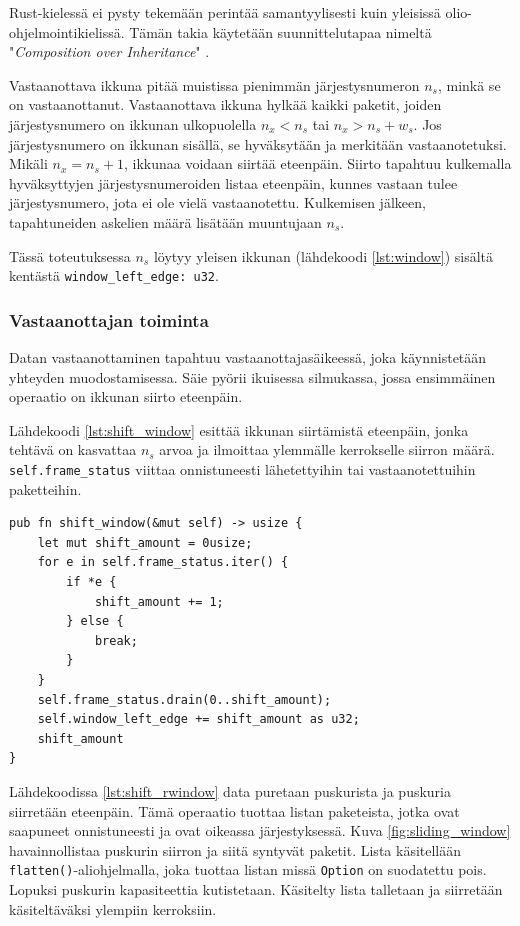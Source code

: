 \documentclass[a4paper,12pt]{article}
\begin{document}
    Rust-kielessä ei pysty tekemään perintää samantyylisesti kuin yleisissä olio-ohjelmointikielissä. Tämän takia
    käytetään suunnittelutapaa nimeltä "\textit{Composition over Inheritance}" \cite{Ivicevic202228Rust}.

    Vastaanottava ikkuna pitää muistissa pienimmän järjestysnumeron $n_s$, minkä se on vastaanottanut.
    Vastaanottava ikkuna hylkää kaikki paketit, joiden järjestysnumero on ikkunan ulkopuolella $n_x < n_s$ tai $n_x > n_s + w_s$. Jos järjestysnumero on ikkunan sisällä, se hyväksytään ja merkitään vastaanotetuksi. Mikäli $n_x = n_s + 1$, ikkunaa voidaan siirtää eteenpäin.
    Siirto tapahtuu kulkemalla hyväksyttyjen järjestysnumeroiden listaa eteenpäin, kunnes vastaan tulee järjestysnumero, jota ei ole vielä vastaanotettu. Kulkemisen jälkeen, tapahtuneiden askelien määrä lisätään muuntujaan $n_s$.

    Tässä toteutuksessa $n_s$ löytyy yleisen ikkunan (lähdekoodi \ref{lst:window}) sisältä kentästä \lstinline{window_left_edge: u32}.


    \subsubsection*{Vastaanottajan toiminta}
    Datan vastaanottaminen tapahtuu vastaanottajasäikeessä, joka käynnistetään yhteyden muodostamisessa.
    Säie pyörii ikuisessa silmukassa, jossa ensimmäinen operaatio on ikkunan siirto eteenpäin.

    Lähdekoodi \ref{lst:shift_window} esittää ikkunan siirtämistä eteenpäin, jonka tehtävä on kasvattaa $n_s$ arvoa ja ilmoittaa ylemmälle kerrokselle siirron määrä.
    \lstinline{self.frame_status} viittaa onnistuneesti lähetettyihin tai vastaanotettuihin paketteihin.

    \begin{lstlisting}[caption={Ikkunan siirto}, label={lst:shift_window}]
pub fn shift_window(&mut self) -> usize {
    let mut shift_amount = 0usize;
    for e in self.frame_status.iter() {
        if *e {
            shift_amount += 1;
        } else {
            break;
        }
    }
    self.frame_status.drain(0..shift_amount);
    self.window_left_edge += shift_amount as u32;
    shift_amount
}\end{lstlisting}

    Lähdekoodissa \ref{lst:shift_rwindow} data puretaan puskurista ja puskuria siirretään eteenpäin. Tämä operaatio tuottaa
    listan paketeista, jotka ovat saapuneet onnistuneesti ja ovat oikeassa järjestyksessä. Kuva \ref{fig:sliding_window} havainnollistaa puskurin siirron ja siitä syntyvät paketit.
    Lista käsitellään \lstinline{flatten()}-aliohjelmalla, joka tuottaa listan missä \lstinline{Option}
    on suodatettu pois. Lopuksi puskurin kapasiteettia kutistetaan. Käsitelty lista talletaan ja siirretään käsiteltäväksi ylempiin kerroksiin. \par
\end{document}
